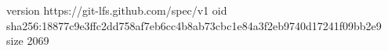 version https://git-lfs.github.com/spec/v1
oid sha256:18877c9e3ffc2dd758af7eb6cc4b8ab73cbc1e84a3f2eb9740d17241f09bb2e9
size 2069
